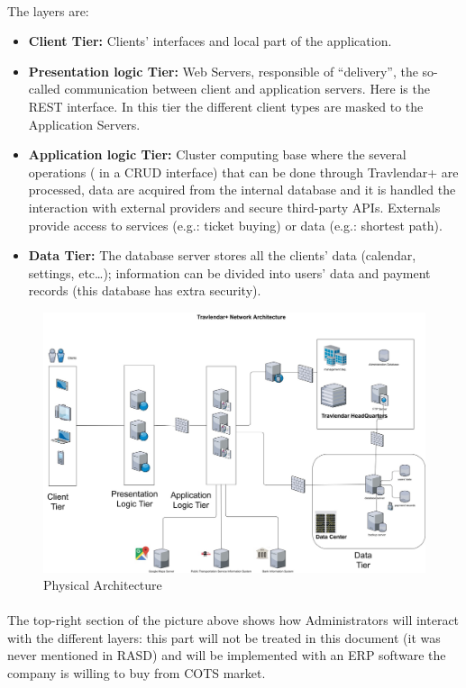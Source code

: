 \documentclass{article}
\begin{document}
			\paragraph{}
The layers are:
			\begin{itemize}
			\item{}\textbf{Client Tier:} Clients’ interfaces and local part of the application.
			\item{}\textbf{Presentation logic Tier:} Web Servers, responsible of “delivery”, the so-called communication between client and application servers. Here is the REST interface. In this tier the different client types are masked to the Application Servers.
			\item{}\textbf{Application logic Tier:} Cluster computing base where the several operations ( in a CRUD interface)  that can be done through Travlendar+ are processed,  data are acquired from the internal database and it is handled the interaction with external providers and secure third-party APIs. Externals provide access to services (e.g.: ticket buying) or data (e.g.: shortest path).
			\item{}\textbf{Data Tier:} The database server stores all the clients’ data (calendar, settings, etc…); information can be divided into users’ data and payment records (this database has extra security).
			\end{itemize}
			\begin{figure}[H]
			\includegraphics[width=\linewidth]{Images/Architecture/Physical_Architecture.jpg}
			\caption{Physical Architecture}
			\label{fig:PA}
			\end{figure}
				\paragraph{}
The top-right section of the picture above shows how Administrators will interact with the different layers: this part will not be treated in this document (it was never mentioned in RASD) and will be implemented with an ERP software the company is willing to buy from COTS market.
\end{document}
